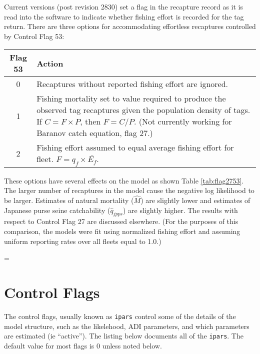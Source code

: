 Current versions (post revision 2830) set a flag in the recapture
record as it is read into the software to indicate whether fishing
effort is recorded for the tag return. There are three options for
accommodating effortless recaptures controlled by Control Flag 53:
\begin{center}
\begin{tabular}{cp{4.0in}}
\hline
Flag 53 & Action\\
\hline
 0 & Recaptures without reported fishing effort are ignored.\\
 1 & Fishing mortality set to value required to produce the observed
tag recaptures given the population density of tags. If $C = F \times
P$, then $F = C/P$. (Not currently working for Baranov catch equation,
flag 27.)\\
 2 & Fishing effort assumed to equal average fishing effort for fleet.
$F = q_f\times \bar{E_f}$.\\
\hline
\end{tabular}
\end{center}

These options have several effects on the model as shown Table
\ref{tab:flag2753}.
The larger number of recaptures in the model cause
the negative log likelihood to be larger. Estimates of natural
mortality ($\widehat{M}$) are slightly lower and estimates of
Japanese purse seine catchability ($\hat{q}_{jpps}$) are slightly
higher.
The results with respect to Control Flag 27 are discussed elsewhere.
(For the purposes of this comparison, the models were fit using
normalized fishing effort and assuming uniform reporting rates over
all fleets equal to 1.0.)




{\baselineskip=\normalbaselineskip
\section*{Control Flags}
The control flags, usually known as {\tt ipars} control some of the
details of the model structure, such as the likelehood, ADI
parameters, and which parameters are estimated (ie ``active''). The
listing below documents all of the {\tt ipars}. The default value for
most flags is $0$ unless noted below.
\begin{list}{}{
  \setlength{\labelwidth}{1.0in}
  \setlength{\labelsep}{0.25in}
  \setlength{\leftmargin}{1.0in}
  \setlength{\itemsep}{0.0ex plus 0.2ex}
  \setlength{\parsep}{0.5ex plus 0.2ex}
  }
  
\end{list}
}

